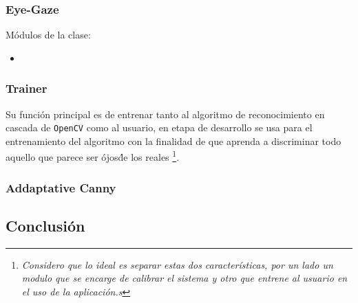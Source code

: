 \documentclass[12pt]{article} %
\begin{document}
        \subsubsection{Eye-Gaze}
        	Módulos de la clase: 
        	
            \begin{itemize}
				\item 
			\end{itemize}
           
            

        \subsubsection{Trainer}
        Su función principal es de entrenar tanto al algoritmo de reconocimiento en cascada de \texttt{OpenCV} como al usuario, en etapa de
        desarrollo se usa para el entrenamiento del algoritmo con la finalidad de que aprenda a discriminar todo aquello que parece ser \'ojos\' de
        los reales \footnote{\scriptsize \textit{Considero que lo ideal es separar estas dos características, por un lado un modulo que se encarge 
        de calibrar el sistema y otro que entrene al usuario en el uso de la aplicación.s }}.
        
        
        
        \subsubsection{Addaptative Canny}
	
\subsection{Conclusión}
  
  	
\newpage


\printnoidxglossaries
{}

\newpage

\end{document}
